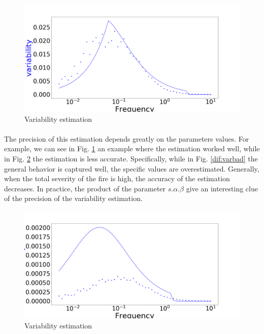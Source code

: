 \documentclass{article}
\begin{document}
\begin{figure}[h!]
\centering
\includegraphics[width=10.cm]{variability_good.png}
\caption{Variability estimation
\label{fig:vargood}
}
\end{figure}

\paragraph{}
The precision of this estimation depends greatly on the parameters values. For example, we can see in Fig. \ref{fig:vargood} an example where the estimation worked well, while in Fig. \ref{fig:varbad} the estimation is less accurate. Specifically, while in Fig. \ref{dif:varbad} the general behavior is captured well, the specific values are overestimated.
Generally, when the total severity of the fire is high, the accuracy of the estimation decreases. In practice, the product of the parameter $s.\alpha.\beta$ give an interesting clue of the precision of the variability estimation.

\begin{figure}[h!]
\centering
\includegraphics[width=10.cm]{variability_bad.png}
\caption{Variability estimation
\label{fig:varbad}
}
\end{figure}
\end{document}
